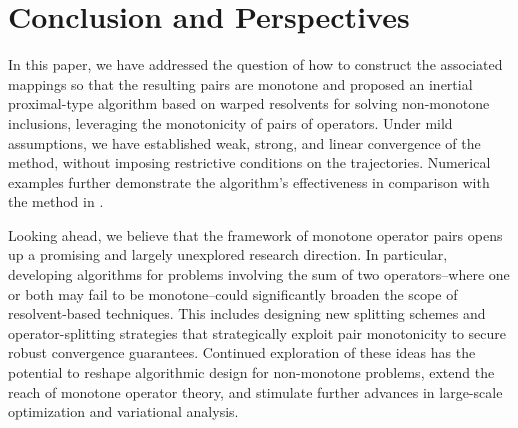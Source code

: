 \documentclass[11pt]{article}
\theoremstyle{definition}
\theoremstyle{definition}
\theoremstyle{definition}
\newcommand{\tcb}{\textcolor{blue}}
\def\tcb{ \textcolor{blue}}
\begin{document}
\section{Conclusion and Perspectives}


In this paper, we have addressed the question of how to construct the associated mappings so that the resulting pairs are monotone and proposed an inertial proximal-type algorithm based on warped resolvents for solving non-monotone inclusions, leveraging the monotonicity of pairs of operators.  Under mild assumptions, we have established weak, strong, and linear convergence of the method, without imposing restrictive conditions on the trajectories. Numerical examples further demonstrate the algorithm's effectiveness in comparison with the method in \cite{LDT}.

Looking ahead, we believe that the framework of monotone operator pairs opens up a promising and largely unexplored research direction. In particular, developing algorithms for problems involving the sum of two operators--where one or both may fail to be monotone--could significantly broaden the scope of resolvent-based techniques. This includes designing new splitting schemes and operator-splitting strategies that strategically exploit pair monotonicity to secure robust convergence guarantees. Continued exploration of these ideas has the potential to reshape algorithmic design for non-monotone problems, extend the reach of monotone operator theory, and stimulate further advances in large-scale optimization and variational analysis.

%
\end{document}

